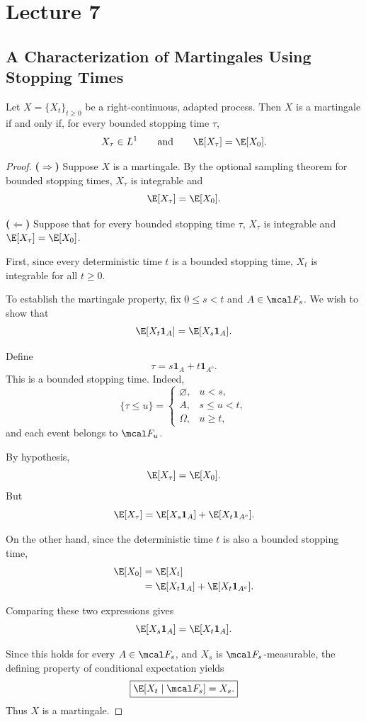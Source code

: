 \section{Lecture 7}

\subsection{A Characterization of Martingales Using Stopping Times}

\begin{theorem}
Let $X=\{X_t\}_{t\geq 0}$ be a right-continuous,
adapted process. Then $X$ is a martingale if and only if,
for every bounded stopping time $\tau$,
\[
    X_\tau\in L^1
    \qquad\text{and}\qquad
    \E[X_\tau]=\E[X_0].
\]
\end{theorem}

\begin{proof}
\textbf{($\Rightarrow$)}
Suppose $X$ is a martingale. By the optional sampling
theorem for bounded stopping times, $X_\tau$ is
integrable and
\[
    \E[X_\tau]=\E[X_0].
\]

\medskip
\noindent
\textbf{($\Leftarrow$)}
Suppose that for every bounded stopping time $\tau$,
$X_\tau$ is integrable and
$\E[X_\tau]=\E[X_0]$.

First, since every deterministic time $t$ is a bounded
stopping time, $X_t$ is integrable for all $t\geq0$.

To establish the martingale property, fix $0\leq s<t$
and $A\in\mcal F_s$. We wish to show that
\[
    \E[X_t\mathbf1_A]=\E[X_s\mathbf1_A].
\]

Define
\[
    \tau=s\mathbf1_A+t\mathbf1_{A^c}.
\]
This is a bounded stopping time. Indeed,
\[
\{\tau\leq u\}=
\begin{cases}
\varnothing, & u<s,\\
A, & s\leq u<t,\\
\Omega, & u\geq t,
\end{cases}
\]
and each event belongs to $\mcal F_u$.

By hypothesis,
\[
    \E[X_\tau]=\E[X_0].
\]
But
\[
    \E[X_\tau]
    =\E[X_s\mathbf1_A]
     +\E[X_t\mathbf1_{A^c}].
\]

On the other hand, since the deterministic time $t$
is also a bounded stopping time,
\[
\begin{aligned}
    \E[X_0]
    &=\E[X_t]\\
    &=\E[X_t\mathbf1_A]
      +\E[X_t\mathbf1_{A^c}].
\end{aligned}
\]

Comparing these two expressions gives
\[
    \E[X_s\mathbf1_A]=\E[X_t\mathbf1_A].
\]

Since this holds for every $A\in\mcal F_s$, and
$X_s$ is $\mcal F_s$-measurable, the defining
property of conditional expectation yields
\[
    \boxed{\E[X_t\mid\mcal F_s]=X_s.}
\]
Thus $X$ is a martingale.
\end{proof}

